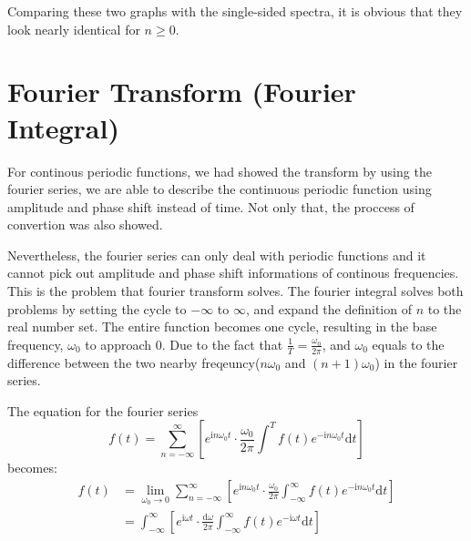 \documentclass[12pt]{article}
\begin{document}
\indent Comparing these two graphs with the single-sided spectra, 
it is obvious that they look nearly identical for $n \ge 0$.











\section{Fourier Transform (Fourier Integral)}
For continous periodic functions, we had showed the transform by using the fourier series, 
we are able to describe the continuous periodic function using amplitude and phase shift instead of time. 
Not only that, the proccess of convertion was also showed. 

Nevertheless, the fourier series can only deal with periodic functions and 
it cannot pick out amplitude and phase shift informations of continous frequencies. 
This is the problem that fourier transform solves.
The fourier integral solves both problems by setting the cycle to $-\infty$ to $\infty$, 
and expand the definition of $n$ to the real number set. 
The entire function becomes one cycle, resulting in the base frequency, 
$\omega_0$ to approach $0$. Due to the fact that $\frac{1}{T}=\frac{\omega_0}{2\pi}$, 
and $\omega_0$ equals to the difference between the two nearby freqeuncy($n\omega_0$ and $(n+1)\omega_0$) 
in the fourier series. 

The equation for the fourier series
$$
    f(t) 
    = \sum_{n=-\infty}^{\infty} \left[ e^{\mathrm{i}n\omega_0t} \cdot
    \frac{\omega_0}{2\pi}\int^{T} f(t)e^{-\mathrm{i}n\omega_0t} \mathrm{d}t\right]
$$
becomes:
$$\begin{aligned}
    f(t) 
    &= \lim_{\omega_0 \to 0} \sum_{n=-\infty}^{\infty} \left[ e^{\mathrm{i}n\omega_0 t} \cdot
    \frac{\omega_0}{2\pi}\int_{-\infty}^{\infty} f(t) e^{-\mathrm{i}n\omega_0 t} \mathrm{d}t \right]   \\
    &= \int_{-\infty}^{\infty}  \left[ e^{\mathrm{i}\omega t} \cdot
    \frac{\mathrm{d}\omega}{2\pi}\int_{-\infty}^{\infty} f(t) e^{-\mathrm{i}\omega t} \mathrm{d}t \right] 
\end{aligned}$$
\end{document}

